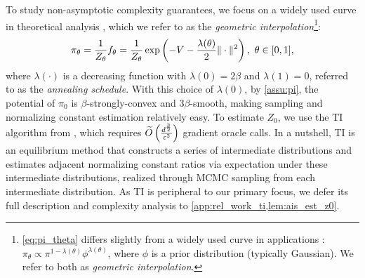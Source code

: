 To study non-asymptotic complexity guarantees, we focus on a widely used curve in theoretical analysis \citep{brosse2018normalizing,ge2020estimating}, which we refer to as the \emph{geometric interpolation}\footnote{\cref{eq:pi_theta} differs slightly from a widely used curve in applications \citep{gelman1998simulating,neal2001annealed}: $\pi_\theta\propto\pi^{1-\lambda(\theta)}\phi^{\lambda(\theta)}$, where $\phi$ is a prior distribution (typically Gaussian). We refer to both as \emph{geometric interpolation}.}:
\begin{equation}
    \pi_\theta=\frac{1}{Z_\theta}f_\theta=\frac{1}{Z_\theta}\exp\left(-V-\frac{\lambda(\theta)}{2}\|\cdot\|^2\right),~\theta\in[0,1],
    \label{eq:pi_theta}
\end{equation}
where $\lambda(\cdot)$ is a decreasing function with $\lambda(0)=2\beta$ and $\lambda(1)=0$, referred to as the \emph{annealing schedule}. With this choice of $\lambda(0)$, by \cref{assu:pi}, the potential of $\pi_0$ is $\beta$-strongly-convex and $3\beta$-smooth, making sampling and normalizing constant estimation relatively easy. To estimate $Z_0$, we use the TI algorithm from \cite{ge2020estimating}, which requires $\widetilde{O}\left(\frac{d^{\frac32}}{\varepsilon^2}\right)$ gradient oracle calls. In a nutshell, TI is an equilibrium method that constructs a series of intermediate distributions and estimates adjacent normalizing constant ratios via expectation under these intermediate distributions, realized through MCMC sampling from each intermediate distribution. As TI is peripheral to our primary focus, we defer its full description and complexity analysis to \cref{app:rel_work_ti,lem:ais_est_z0}.

